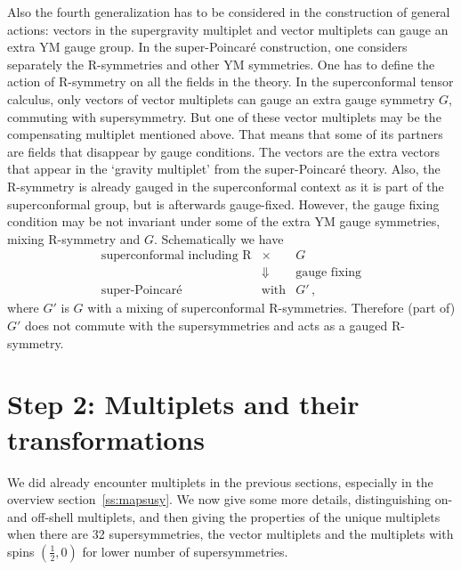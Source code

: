 \documentclass[a4paper,11pt,twoside]{article}
\newcommand{\ft}[2]{{\textstyle\frac{#1}{#2}}}
\begin{document}
Also the fourth generalization has to be considered in the construction
of general actions: vectors in the supergravity multiplet and vector
multiplets can gauge an extra YM gauge group. In the super-Poincar{\'e}
construction, one considers separately the R-symmetries and other YM
symmetries. One has to define the action of R-symmetry on all the fields
in the theory. In the superconformal tensor calculus, only vectors of
vector multiplets can gauge an extra gauge symmetry $G$, commuting with
supersymmetry. But one of these vector multiplets may be the compensating
multiplet mentioned above. That means that some of its partners are
fields that disappear by gauge conditions. The vectors are the extra
vectors that appear in the `gravity multiplet' from the super-Poincar{\'e}
theory. Also, the R-symmetry is already gauged in the superconformal
context as it is part of the superconformal group, but is afterwards
gauge-fixed. However, the gauge fixing condition may be not invariant
under some of the extra YM gauge symmetries, mixing R-symmetry and $G$.
Schematically we have
\begin{eqnarray}
 \mbox{superconformal including R} & \times  & G \nonumber\\
   & \Downarrow & \mbox{gauge fixing}\nonumber\\
   \mbox{super-Poincar{\'e}} &\mbox{with}& G'\,,
 \label{mixingSPSC}
\end{eqnarray}
where $G'$ is $G$ with a mixing of superconformal R-symmetries. Therefore
(part of) $G'$ does not commute with the supersymmetries and acts as a
gauged R-symmetry.

\section{Step 2: Multiplets and their transformations}
\label{ss:multiplets}

We did already encounter multiplets in the previous sections, especially
in the overview section~\ref{ss:mapsusy}. We now give some more details,
distinguishing on- and off-shell multiplets, and then giving the
properties of the unique multiplets when there are 32 supersymmetries,
the vector multiplets and the multiplets with spins $(\ft12,0)$ for lower
number of supersymmetries.
\end{document}
